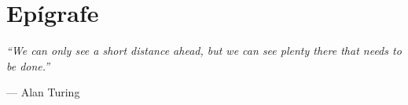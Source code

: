 \chapter*{Epígrafe}


\thispagestyle{empty}

\vspace{2cm} %

\begin{epigrafe}
	\begin{flushright}
		\begin{minipage}{0.6\textwidth}
		\itshape
		``We can only see a short distance ahead, but we can see plenty there that needs to be done.''

		\vspace{0.5em}
		\raggedleft
		— Alan Turing
		\end{minipage}
	\end{flushright}
\end{epigrafe}



